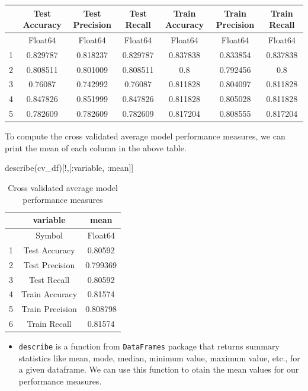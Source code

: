 \documentclass[
  letterpaper,
]{book}
\newenvironment{Shaded}{\begin{snugshade}}{\end{snugshade}}
\newcommand{\FunctionTok}[1]{\textcolor[rgb]{0.28,0.35,0.67}{#1}}
\newcommand{\NormalTok}[1]{\textcolor[rgb]{0.00,0.23,0.31}{#1}}
\newcommand{\OperatorTok}[1]{\textcolor[rgb]{0.37,0.37,0.37}{#1}}
\providecommand{\tightlist}{%
  \setlength{\itemsep}{0pt}\setlength{\parskip}{0pt}}\usepackage{longtable,booktabs,array}
\begin{document}
\begin{tabular}{r|cccccc}
    & Test Accuracy & Test Precision & Test Recall & Train Accuracy & Train Precision & Train Recall\\
    \hline
    & Float64 & Float64 & Float64 & Float64 & Float64 & Float64\\
    \hline
    1 & 0.829787 & 0.818237 & 0.829787 & 0.837838 & 0.833854 & 0.837838 \\
    2 & 0.808511 & 0.801009 & 0.808511 & 0.8 & 0.792456 & 0.8 \\
    3 & 0.76087 & 0.742992 & 0.76087 & 0.811828 & 0.804097 & 0.811828 \\
    4 & 0.847826 & 0.851999 & 0.847826 & 0.811828 & 0.805028 & 0.811828 \\
    5 & 0.782609 & 0.782609 & 0.782609 & 0.817204 & 0.808555 & 0.817204 \\
\end{tabular}

To compute the cross validated average model performance measures, we
can print the mean of each column in the above table.

\begin{Shaded}
\begin{Highlighting}[]
\FunctionTok{describe}\NormalTok{(cv\_df)[!,[}\OperatorTok{:}\NormalTok{variable, }\OperatorTok{:}\NormalTok{mean]]}
\end{Highlighting}
\end{Shaded}

\begin{table}
\caption{Cross validated average model performance measures}

\centering
\begin{tabular}{r|cc}
    & variable & mean\\
    \hline
    & Symbol & Float64\\
    \hline
    1 & Test Accuracy & 0.80592 \\
    2 & Test Precision & 0.799369 \\
    3 & Test Recall & 0.80592 \\
    4 & Train Accuracy & 0.81574 \\
    5 & Train Precision & 0.808798 \\
    6 & Train Recall & 0.81574 \\
\end{tabular}
\end{table}

\begin{itemize}
\tightlist
\item
  \texttt{describe} is a function from \texttt{DataFrames} package that
  returns summary statistics like mean, mode, median, minimum value,
  maximum value, etc., for a given dataframe. We can use this function
  to otain the mean values for our performance measures.
\end{itemize}
\end{document}

